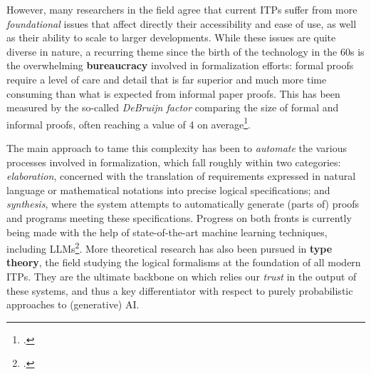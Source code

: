 \documentclass[12pt,draftproposal]{msca-pf}
\begin{document}
However, many researchers in the field agree that current ITPs suffer from more \emph{foundational}
issues that affect directly their accessibility and ease of use, as well as their ability to scale
to larger developments. While these issues are quite diverse in nature, a recurring theme since the
birth of the technology in the 60s is the overwhelming \textbf{bureaucracy} involved in
formalization efforts: formal proofs require a level of care and detail that is far superior and
much more time consuming than what is expected from informal paper proofs. This has been measured by
the so-called \emph{DeBruijn factor} comparing the size of formal and informal proofs, often
reaching a value of 4 on average\footcite{debruijn_factor}.

The main approach to tame this complexity has been to \emph{automate} the various processes involved
in formalization, which fall roughly within two categories: \emph{elaboration}, concerned with the
translation of requirements expressed in natural language or mathematical notations into precise
logical specifications; and \emph{synthesis}, where the system attempts to automatically generate
(parts of) proofs and programs meeting these specifications. Progress on both fronts is currently
being made with the help of state-of-the-art machine learning techniques, including
LLMs\footcite{blaauwbroekLearningGuidedAutomated2024}. More theoretical research has also been
pursued in \textbf{type theory}, the field studying the logical formalisms at the foundation of all
modern ITPs. They are the ultimate backbone on which relies our \emph{trust} in the output of these
systems, and thus a key differentiator with respect to purely probabilistic approaches to
(generative) AI.
\end{document}
